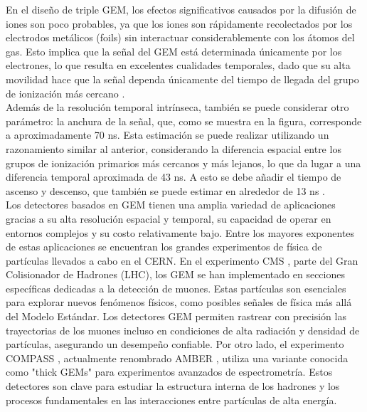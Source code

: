 \documentclass{article}
\begin{document}
\noindent En el diseño de triple GEM, los efectos significativos causados por la difusión de iones son poco probables, ya que los iones son rápidamente recolectados por los electrodos metálicos (foils) sin interactuar considerablemente con los átomos del gas. Esto implica que la señal del GEM está determinada únicamente por los electrones, lo que resulta en excelentes cualidades temporales, dado que su alta movilidad hace que la señal dependa únicamente del tiempo de llegada del grupo de ionización más cercano \cite{mocellin2021performance}.\\

\noindent Además de la resolución temporal intrínseca, también se puede considerar otro parámetro: la anchura de la señal, que, como se muestra en la figura, corresponde a aproximadamente 70 ns. Esta estimación se puede realizar utilizando un razonamiento similar al anterior, considerando la diferencia espacial entre los grupos de ionización primarios más cercanos y más lejanos, lo que da lugar a una diferencia temporal aproximada de 43 ns. A esto se debe añadir el tiempo de ascenso y descenso, que también se puede estimar en alrededor de 13 ns \cite{mocellin2021performance}.\\

\noindent Los detectores basados en GEM tienen una amplia variedad de aplicaciones gracias a su alta resolución espacial y temporal, su capacidad de operar en entornos complejos y su costo relativamente bajo. Entre los mayores exponentes de estas aplicaciones se encuentran los grandes experimentos de física de partículas llevados a cabo en el CERN. En el experimento CMS \cite{abbaneo2013gem} \cite{colaleo2015cms}, parte del Gran Colisionador de Hadrones (LHC), los GEM se han implementado en secciones específicas dedicadas a la detección de muones. Estas partículas son esenciales para explorar nuevos fenómenos físicos, como posibles señales de física más allá del Modelo Estándar. Los detectores GEM permiten rastrear con precisión las trayectorias de los muones incluso en condiciones de alta radiación y densidad de partículas, asegurando un desempeño confiable. Por otro lado, el experimento COMPASS \cite{ketzer2004performance}, actualmente renombrado AMBER \cite{alexeev2023development}, utiliza una variante conocida como "thick GEMs" para experimentos avanzados de espectrometría. Estos detectores son clave para estudiar la estructura interna de los hadrones y los procesos fundamentales en las interacciones entre partículas de alta energía.\\
\end{document}
